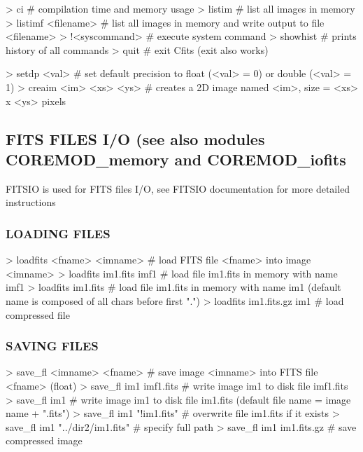 \begin{DoxyVerb}> ci
    # compilation time and memory usage
> listim 
    # list all images in memory
> listimf <filename> 
    # list all images in memory and write output to file <filename>
> !<syscommand>             
    # execute system command
> showhist                  
    # prints history of all commands
> quit                      
    # exit Cfits (exit also works)

> setdp <val>            
    # set default precision to float (<val> = 0) or double (<val> = 1)
> creaim <im> <xs> <ys>     
    # creates a 2D image named <im>, size = <xs> x <ys> pixels
\end{DoxyVerb}


\subsection*{F\+I\+T\+S F\+I\+L\+E\+S I/\+O (see also modules C\+O\+R\+E\+M\+O\+D\+\_\+memory and C\+O\+R\+E\+M\+O\+D\+\_\+iofits}

F\+I\+T\+S\+I\+O is used for F\+I\+T\+S files I/\+O, see F\+I\+T\+S\+I\+O documentation for more detailed instructions~\newline
 \subsubsection*{L\+O\+A\+D\+I\+N\+G F\+I\+L\+E\+S}

\begin{DoxyVerb}> loadfits <fname> <imname> 
    # load FITS file <fname> into image <imname>
> loadfits im1.fits imf1    
    # load file im1.fits in memory with name imf1
> loadfits im1.fits      
    # load file im1.fits in memory with name im1 (default name is composed of all chars before first ".")
> loadfits im1.fits.gz im1  
    # load compressed file
\end{DoxyVerb}


\subsubsection*{S\+A\+V\+I\+N\+G F\+I\+L\+E\+S}

\begin{DoxyVerb}> save_fl  <imname> <fname> 
    # save image <imname> into FITS file <fname> (float)
> save_fl im1 imf1.fits      
    # write image im1 to disk file imf1.fits
> save_fl im1
    # write image im1 to disk file im1.fits (default file name = image name + ".fits")
> save_fl im1 "!im1.fits"   
    # overwrite file im1.fits if it exists
> save_fl im1 "../dir2/im1.fits"
    # specify full path
> save_fl im1 im1.fits.gz   
    # save compressed image
\end{DoxyVerb}



